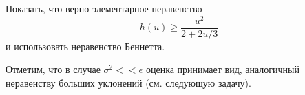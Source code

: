 \begin{remark} 
Показать, что верно элементарное неравенство 
\begin{equation*}
h(u)\geq \frac{u^2}{2+2u/3}
\end{equation*}
и использовать неравенство Беннетта.

Отметим, что в случае $\sigma^2<< \epsilon$ оценка принимает вид, аналогичный  неравенству больших уклонений (см. следующую задачу).
\end{remark}
\begin{comment}
\begin{problem} Пусть $Y$ случайная величина,  $Y\in [-1,+1]$ и $\mathbf{E}[Y]=0$. Тогда для любого $t\geq 0$ верно 
\begin{equation*}
\mathbf{E}[\exp(tY)]\leq \exp(t^2/2).
\end{equation*}
\end{problem}

\begin{remark}
Использовать выпуклость $\exp(tx)$, а именно для $x\in[-1,1]$ верно.
\begin{equation*}
\text{e}^{tx}\leq \frac{1}{2}(1+x)\text{e}^{t} +\frac{1}{2}(1-x)\text{e}^{-t}
\end{equation*}
Подсчитать оценку математического ожидания $\mathbf{E}[\text{e}^{tY}]$ используя разложение экспоненты в ряд Тейлора и элементарный факт $(2n)!>2^nn!$.  
\end{remark}

\begin{problem}[Мартингальное неравенство Азумы-Хевдинга]

Пусть $\{X_i\}_{i=0}^{\infty}$ мартингал по отношению к фильтрации $\{\mathcal{F}_i\}$, пусть $Y_i = X_i-X_{i-1}$ соответствующая последовательность приращений. Тогда, если существуют такие $c_i>0$, что $|Y_i|\leq c_i$ для всех $i$, то 
\begin{equation*}
\mathbf{P}\{\sup_{n\geq m} |X_n-X_0|\geq t\}\leq 2\exp\bigg\{\frac{-t^2}{2\sum_{i=1}^{m}c^2_i}\biggl\}
\end{equation*}
\end{problem}

\begin{remark}

\begin{enumerate}
\item \textit{Использовать теорему Дуба.} 
\item \textit{Cпособ для доказательства не равномерного варианта теоремы использует результат задачи 12.}


\end{comment}
